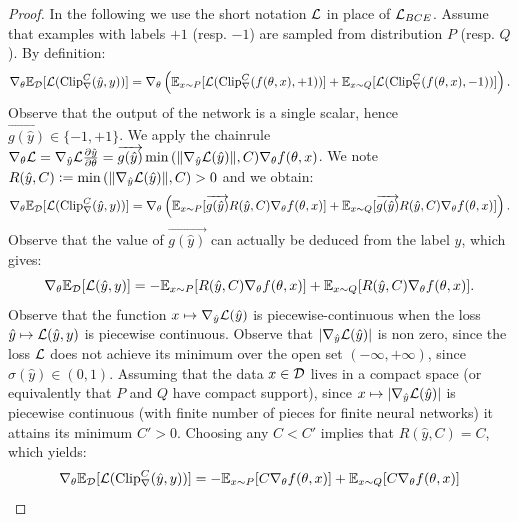     \begin{proof}
    In the following we use the short notation $\mathcal{L}$ in place of $\mathcal{L}_{BCE}$. Assume that examples with labels $+1$ (resp. $-1$) are sampled from distribution $P$ (resp. $Q$).
    By definition:
    \begin{equation*}
         \nabla_{\theta}\mathbb{E}_{\mathcal{D}}[\mathcal{L}(\text{Clip}^C_{\nabla}(\hat y,y))] = \nabla_{\theta}\left(\mathbb{E}_{x\sim P}[\mathcal{L}(\text{Clip}^C_{\nabla}(f(\theta, x),+1))]+\mathbb{E}_{x\sim Q}[\mathcal{L}(\text{Clip}^C_{\nabla}(f(\theta, x),-1))]\right).
    \end{equation*}
    Observe that the output of the network is a single scalar, hence $\overrightarrow{g(\hat y)}\in\{-1,+1\}$. We apply the chainrule $\nabla_{\theta}\mathcal{L}=\nabla_{\hat y}\mathcal{L}\frac{\partial \hat y}{\partial \theta}=\overrightarrow{g(\hat y)}\min{(\|\nabla_{\hat y}\mathcal{L}(\hat y)\|,C)}\nabla_{\theta}f(\theta, x)$. We note $R(\hat y,C)\vcentcolon=\min{(\|\nabla_{\hat y}\mathcal{L}(\hat y)\|,C)}>0$ and we obtain:
    \begin{equation}
        \nabla_{\theta}\mathbb{E}_{\mathcal{D}}[\mathcal{L}(\text{Clip}^C_{\nabla}(\hat y,y))] = \nabla_{\theta}\left(\mathbb{E}_{x\sim P}[\overrightarrow{g(\hat y)}R(\hat y,C)\nabla_{\theta}f(\theta, x)]+\mathbb{E}_{x\sim Q}[\overrightarrow{g(\hat y)}R(\hat y,C)\nabla_{\theta}f(\theta, x)]\right).
    \end{equation}
    Observe that the value of $\overrightarrow{g(\hat y)}$ can actually be deduced from the label $y$, which gives:
    \begin{equation}
        \nabla_{\theta}\mathbb{E}_{\mathcal{D}}[\mathcal{L}(\hat y,y)] = -\mathbb{E}_{x\sim P}[R(\hat y,C)\nabla_{\theta}f(\theta, x)]+\mathbb{E}_{x\sim Q}[R(\hat y,C)\nabla_{\theta}f(\theta, x)].
    \end{equation}
    Observe that the function $x\mapsto \nabla_{\hat y}\mathcal{L}(\hat y)$ is piecewise-continuous when the loss $\hat y\mapsto \mathcal{L}(\hat y, y)$ is piecewise continuous. Observe that $|\nabla_{\hat y}\mathcal{L}(\hat y)|$ is non zero, since the loss $\mathcal{L}$ does not achieve its minimum over the open set $(-\infty,+\infty)$, since $\sigma(\hat y)\in (0,1)$. Assuming that the data $x\in\mathcal{D}$ lives in a compact space (or equivalently that $P$ and $Q$ have compact support), since $x\mapsto|\nabla_{\hat y}\mathcal{L}(\hat y)|$ is piecewise continuous (with finite number of pieces for finite neural networks) it attains its minimum $C'>0$. Choosing any $C<C'$ implies that $R(\hat y, C)=C$, which yields:
    \begin{align*}
        \nabla_{\theta}\Expect_{\Dataset}[\Loss(\text{Clip}^C_{\nabla}(\hat y,y))] &= -\Expect_{x\sim P}[C\nabla_{\theta}f(\theta, x)]+\Expect_{x\sim Q}[C\nabla_{\theta}f(\theta, x)]\\

\end{align*}
\end{proof}
